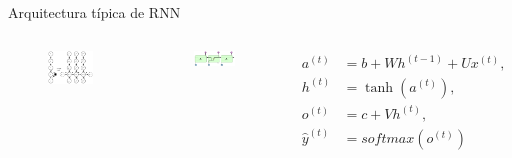 \begin{frame}{Arquitectura típica de RNN}

    \begin{columns}
        \centering
        \begin{figure}
            \includegraphics[width=1\linewidth]{Images/grafo 2.png}
        \end{figure}
        
        
        \centering
        \begin{figure}
            \centering
            \includegraphics[width=1\linewidth]{Images/rnng.png}
        \end{figure}
        \begin{align*}
                a^{(t)} &= b + Wh^{(t-1)} + Ux^{(t)},\\
                h^{(t)} &= \tanh{(a^{(t)})}, \\
                o^{(t)} &= c + Vh^{(t)}, \\
                \hat{y}^{(t)} &= softmax(o^{(t)})
            \end{align*}
    \end{columns}
    
    
    
\end{frame}

